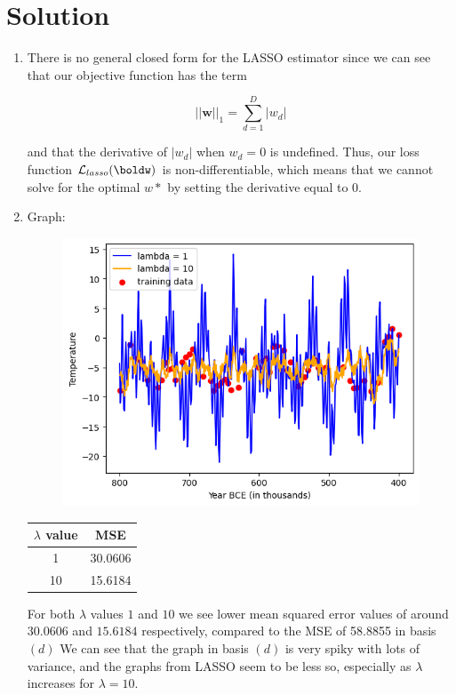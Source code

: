 \documentclass[submit]{../harvardml}
\newenvironment{solution}
  {\color{blue}\section*{Solution}}
{}
\begin{document}
\begin{solution}
\begin{enumerate}
        \item There is no general closed form for the LASSO estimator since we can see that our objective function has the term

        \[
        ||\bm w||_1 = \sum_{d=1}^D |w_d|
        \]

        and that the derivative of $|w_d|$ when $w_d=0$ is undefined. Thus, our loss function $\mathcal{L}_{lasso}(\boldw)$ is non-differentiable, which means that we cannot solve for the optimal $w*$ by setting the derivative equal to 0.

        \item Graph:

        \begin{figure}[H]
            \centering
            \includegraphics[width=0.75\linewidth]{image.png}
        \end{figure}

        \begin{table}[h]
                \centering
                {\color{blue}
                \begin{tabular}{|c|c|}
                    \hline
                    \textbf{$\lambda$ value} & \textbf{MSE} \\
                    \hline
                    1 & 30.0606 \\
                    10 & 15.6184 \\
                    \hline
                \end{tabular}}
                \label{tab:mse_values}
            \end{table}

        For both $\lambda$ values $1$ and $10$ we see lower mean squared error values of around $30.0606$ and $15.6184$ respectively, compared to the MSE of 58.8855 in basis $(d)$ We can see that the graph in basis $(d)$ is very spiky with lots of variance, and the graphs from LASSO seem to be less so, especially as $\lambda$ increases for $\lambda=10$.
        
	\end{enumerate}
\end{solution}
\end{document}
